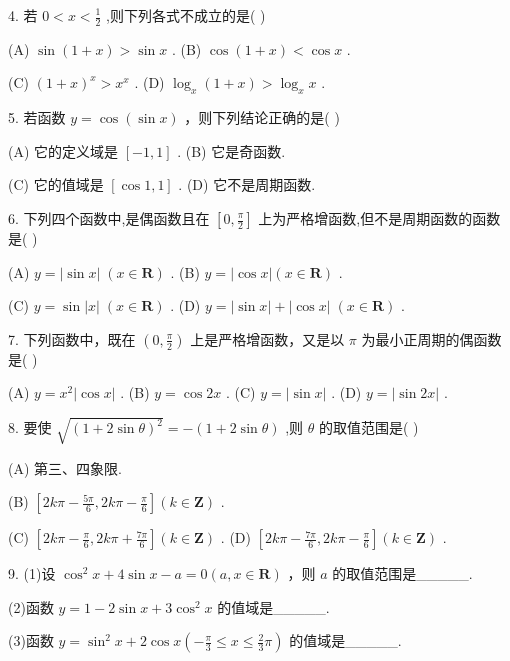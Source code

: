 \documentclass[10pt]{article}
\begin{document}
4. 若 \(0 < x < \frac{1}{2}\) ,则下列各式不成立的是( )

(A) \(\sin \left( {1 + x}\right)  > \sin x\) . (B) \(\cos \left( {1 + x}\right)  < \cos x\) .

(C) \({\left( 1 + x\right) }^{x} > {x}^{x}\) . (D) \({\log }_{x}\left( {1 + x}\right)  > {\log }_{x}x\) .

5. 若函数 \(y = \cos \left( {\sin x}\right)\) ，则下列结论正确的是( )

(A) 它的定义域是 \(\left\lbrack  {-1,1}\right\rbrack\) . (B) 它是奇函数.

(C) 它的值域是 \(\left\lbrack  {\cos 1,1}\right\rbrack\) . (D) 它不是周期函数.

6. 下列四个函数中,是偶函数且在 \(\left\lbrack  {0,\frac{\pi }{2}}\right\rbrack\) 上为严格增函数,但不是周期函数的函数是( )

(A) \(y = \left| {\sin x}\right| \;\left( {x \in  \mathbf{R}}\right)\) . (B) \(y = \left| {\cos x}\right| \left( {x \in  \mathbf{R}}\right)\) .

(C) \(y = \sin \left| x\right| \;\left( {x \in  \mathbf{R}}\right)\) . (D) \(y = \left| {\sin x}\right|  + \left| {\cos x}\right| \;\left( {x \in  \mathbf{R}}\right)\) .

7. 下列函数中，既在 \(\left( {0,\frac{\pi }{2}}\right)\) 上是严格增函数，又是以 \(\pi\) 为最小正周期的偶函数是( )

(A) \(y = {x}^{2}\left| {\cos x}\right|\) . (B) \(y = \cos {2x}\) . (C) \(y = \left| {\sin x}\right|\) . (D) \(y = \left| {\sin {2x}}\right|\) .

8. 要使 \(\sqrt{{\left( 1 + 2\sin \theta \right) }^{2}} =  - \left( {1 + 2\sin \theta }\right)\) ,则 \(\theta\) 的取值范围是( )

(A) 第三、四象限.

(B) \(\left\lbrack  {{2k\pi } - \frac{5\pi }{6},{2k\pi } - \frac{\pi }{6}}\right\rbrack  \left( {k \in  \mathbf{Z}}\right)\) .

(C) \(\left\lbrack  {{2k\pi } - \frac{\pi }{6},{2k\pi } + \frac{7\pi }{6}}\right\rbrack  \left( {k \in  \mathbf{Z}}\right)\) . (D) \(\left\lbrack  {{2k\pi } - \frac{7\pi }{6},{2k\pi } - \frac{\pi }{6}}\right\rbrack  \left( {k \in  \mathbf{Z}}\right)\) .

9. (1)设 \({\cos }^{2}x + 4\sin x - a = 0\left( {a,x \in  \mathbf{R}}\right)\) ，则 \(a\) 的取值范围是\_\_\_\_\_.

(2)函数 \(y = 1 - 2\sin x + 3{\cos }^{2}x\) 的值域是\_\_\_\_\_.

(3)函数 \(y = {\sin }^{2}x + 2\cos x\left( {-\frac{\pi }{3} \leq  x \leq  \frac{2}{3}\pi }\right)\) 的值域是\_\_\_\_\_.
\end{document}
